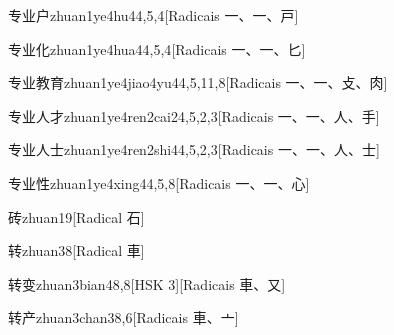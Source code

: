\begin{entry}{专业户}{zhuan1ye4hu4}{4,5,4}[Radicais ⼀、⼀、⼾]
\end{entry}

\begin{entry}{专业化}{zhuan1ye4hua4}{4,5,4}[Radicais ⼀、⼀、⼔]
\end{entry}

\begin{entry}{专业教育}{zhuan1ye4jiao4yu4}{4,5,11,8}[Radicais ⼀、⼀、⽁、⾁]
\end{entry}

\begin{entry}{专业人才}{zhuan1ye4ren2cai2}{4,5,2,3}[Radicais ⼀、⼀、⼈、⼿]
\end{entry}

\begin{entry}{专业人士}{zhuan1ye4ren2shi4}{4,5,2,3}[Radicais ⼀、⼀、⼈、⼠]
\end{entry}

\begin{entry}{专业性}{zhuan1ye4xing4}{4,5,8}[Radicais ⼀、⼀、⼼]
\end{entry}

\begin{entry}{砖}{zhuan1}{9}[Radical ⽯]
\end{entry}

\begin{entry}{转}{zhuan3}{8}[Radical ⾞]
\end{entry}

\begin{entry}{转变}{zhuan3bian4}{8,8}[HSK 3][Radicais ⾞、⼜]
\end{entry}

\begin{entry}{转产}{zhuan3chan3}{8,6}[Radicais ⾞、⼇]
\end{entry}

